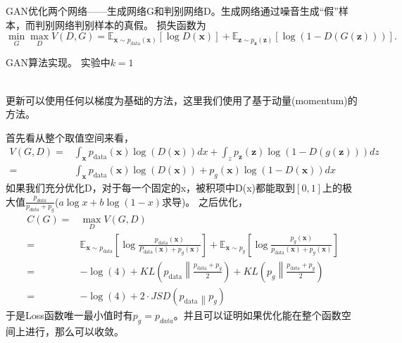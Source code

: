 \documentclass[a4paper]{article}
\begin{document}
GAN优化两个网络——生成网络G和判别网络D。生成网络通过噪音生成“假”样本，而判别网络判别样本的真假。
损失函数为
$$
\min_G \max_D V(D, G) = \mathbb{E}_{\bm{x} \sim p_{\text{data}}(\bm{x})}[\log D(\bm{x})] + \mathbb{E}_{\bm{z} \sim p_{\bm{z}}(\bm{z})}[\log (1 - D(G(\bm{z})))].
$$
\begin{algorithm}[ht]
\caption{\small GAN算法实现。
实验中$k=1$
}
\begin{algorithmic}
\label{alg:AGF}
   \ENDFOR
  \ENDFOR
  \\更新可以使用任何以梯度为基础的方法，这里我们使用了基于动量(momentum)的方法。
\end{algorithmic}
\end{algorithm}
首先看从整个取值空间来看，
\begin{align}
V(G, D) =& \int_{\bm{x}} p_\text{data}(\bm{x}) \log(D(\bm{x})) dx + \int_z p_{\bm{z}}(\bm{z}) \log(1 - D(g(\bm{z}))) dz \nonumber \\
		=& \int_{\bm{x}} p_\text{data}(\bm{x}) \log(D(\bm{x})) + p_g(\bm{x}) \log(1 - D(\bm{x})) dx
\end{align}
如果我们充分优化D，对于每一个固定的x，被积项中D(x)都能取到$[0,1]$上的极大值$\frac{p_{data}}{p_{data} + p_g}$($a\log x+b \log (1-x)$求导)。
之后优化，\begin{align}
\label{eq:G-criterion}
 C(G) =& \max_D V(G,D) \nonumber \\
      =& \mathbb{E}_{\bm{x} \sim p_\text{data}}\left[\log \frac{p_\text{data}(\bm{x})}{P_\text{data}(\bm{x}) + p_g(\bm{x})}\right] + 
         \mathbb{E}_{\bm{x} \sim p_g}\left[\log \frac{p_g(\bm{x})}{p_\text{data}(\bm{x}) + p_g(\bm{x})}\right] \nonumber \\
      =& -\log(4) + KL \left(p_\text{data} \left \| \frac{p_\text{data} + p_g}{2} \right. \right) + KL \left(p_g \left \| \frac{p_\text{data} + p_g}{2} \right. \right) \nonumber \\
      =& - \log(4) + 2 \cdot JSD \left(p_\text{data} \left \| p_g \right. \right)\nonumber
\end{align}
于是Loss函数唯一最小值时有$p_g = p_{data}$。并且可以证明如果优化能在整个函数空间上进行，那么可以收敛。
\end{document}
